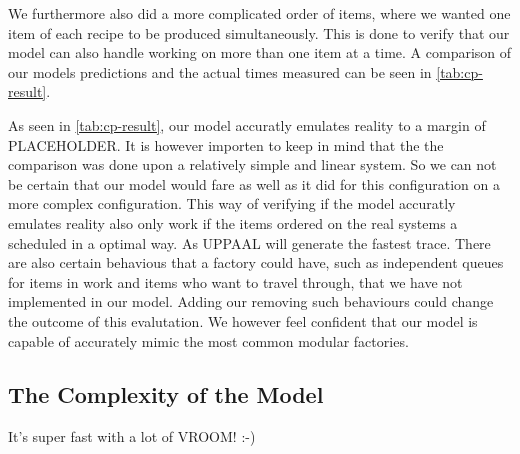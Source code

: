 

We furthermore also did a more complicated order of items, where we wanted one item of each recipe to be produced simultaneously. This is done to verify that our model can also handle working on more than one item at a time. A comparison of our models predictions and the actual times measured can be seen in \cref{tab:cp-result}.



As seen in \cref{tab:cp-result}, our model accuratly emulates reality to a margin of PLACEHOLDER. It is however importen to keep in mind that the the comparison was done upon a relatively simple and linear system. So we can not be certain that our model would fare as well as it did for this configuration on a more complex configuration. This way of verifying if the model accuratly emulates reality also only work if the items ordered on the real systems a scheduled in a optimal way. As UPPAAL will generate the fastest trace. There are also certain behavious that a factory could have, such as independent queues for items in work and items who want to travel through, that we have not implemented in our model. Adding our removing such behaviours could change the outcome of this evalutation. We however feel confident that our model is capable of accurately mimic the most common modular factories.

 




\subsection{The Complexity of the Model}

It's super fast with a lot of VROOM!
:-) 